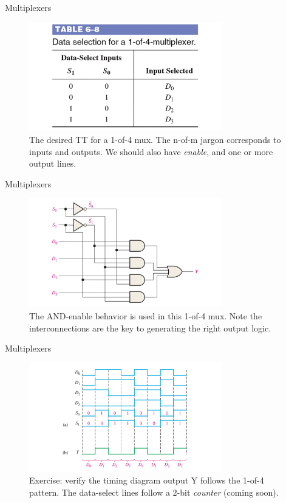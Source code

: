 \documentclass{beamer}
\begin{document}
\begin{frame}{Multiplexers}
\begin{figure}
\centering
\includegraphics[width=0.75\textwidth,trim=3cm 0cm 3cm 0cm,clip=true]{figures/mux2.pdf}
\caption{\label{fig:mux2} The desired TT for a 1-of-4 mux.  The n-of-m jargon corresponds to inputs and outputs.  We should also have \textit{enable}, and one or more output lines.}
\end{figure}
\end{frame}

\begin{frame}{Multiplexers}
\begin{figure}
\centering
\includegraphics[width=0.75\textwidth,trim=3cm 0cm 3cm 0cm,clip=true]{figures/mux3.pdf}
\caption{\label{fig:mux3} The AND-enable behavior is used in this 1-of-4 mux.  Note the interconnections are the key to generating the right output logic.}
\end{figure}
\end{frame}

\begin{frame}{Multiplexers}
\begin{figure}
\centering
\includegraphics[width=0.75\textwidth,trim=3cm 0cm 3cm 0cm,clip=true]{figures/mux4.pdf}
\caption{\label{fig:mux4} Exercise: verify the timing diagram output Y follows the 1-of-4 pattern.  The data-select lines follow a 2-bit \textit{counter} (coming soon).}
\end{figure}
\end{frame}
\end{document}

